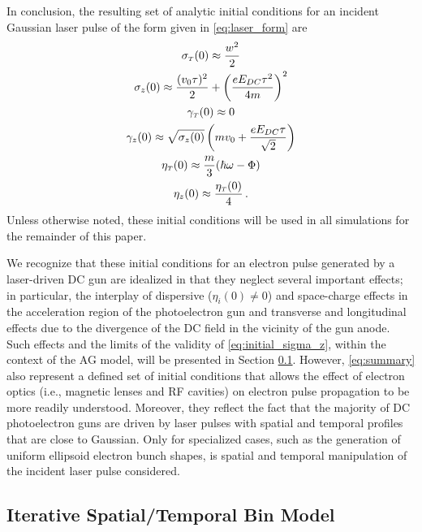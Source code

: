 In conclusion, the resulting set of analytic initial conditions for an incident Gaussian laser pulse of the form given in \ref{eq:laser_form} are
\begin{subequations} \label{eq:summary}
  \begin{gather}
    \sigma_{ {\scriptscriptstyle T} } ( 0 ) \approx \frac{ w^{ 2 } }{ 2 } \\
    \sigma_{ z } ( 0 ) \approx \frac{ ( v_{ 0 } \tau )^{ 2 } }{ 2 } + \left ( \frac{ e E_{ DC } \tau^{ 2 } }{ 4 m } \right )^{ 2 } \\
    \gamma_{ {\scriptscriptstyle T} } ( 0 ) \approx 0 \\
    \gamma_{ z } ( 0 ) \approx \sqrt{ \sigma_{ z } ( 0 ) } \left ( m v_{ 0 } + \frac{ e E_{DC} \tau }{ \sqrt{ 2 } } \right ) \\
    \eta_{ {\scriptscriptstyle T} } ( 0 ) \approx \frac{ m }{ 3 } ( \hbar \omega - \Phi ) \\
    \eta_{ z } ( 0 ) \approx \frac{ \eta_{ {\scriptscriptstyle T} } ( 0 ) }{ 4 } \, \text{.}
  \end{gather}
\end{subequations}
Unless otherwise noted, these initial conditions will be used in all simulations for the remainder of this paper.

We recognize that these initial conditions for an electron pulse generated by a laser-driven DC gun are idealized in that they neglect several important effects; in particular, the interplay of dispersive ($ \eta_{i}(0) \neq 0 $) and space-charge effects in the acceleration region of the photoelectron gun and transverse and longitudinal effects due to the divergence of the DC field in the vicinity of the gun anode.\cite{berger_dc_2009,togawa_ceb6_2007}
Such effects and the limits of the validity of \ref{eq:initial_sigma_z}, within the context of the AG model, will be presented in Section \ref{sec:bin_model}.
However, \ref{eq:summary} also represent a defined set of initial conditions that allows the effect of electron optics (i.e., magnetic lenses and RF cavities) on electron pulse propagation to be more readily understood.
Moreover, they reflect the fact that the majority of DC photoelectron guns are driven by laser pulses with spatial and temporal profiles that are close to Gaussian.\cite{williamson_clocking_1997,sciaini_electronic_2009}
Only for specialized cases, such as the generation of uniform ellipsoid electron bunch shapes, is spatial and temporal manipulation of the incident laser pulse considered.\cite{luiten_how_2004,li_generating_2008}

\subsection{Iterative Spatial/Temporal Bin Model} \label{sec:bin_model}

